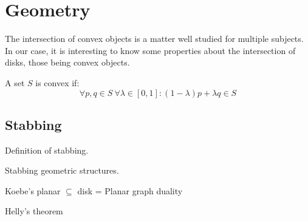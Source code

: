\section{Geometry}
\label{sec:geom}

The intersection of convex objects is a matter well studied for multiple
subjects. In our case, it is interesting to know some properties about
the intersection of disks, those being convex objects.

A set $S$ is convex if:
$$\forall p,q \in S\  \forall \lambda \in [0,1]: (1-\lambda)p + \lambda q \in S$$


\subsection{Stabbing}

Definition of stabbing.

Stabbing geometric structures.\cite{schlipf2013stabbing}

Koebe's planar $\subseteq$ disk
  = Planar graph duality

Helly's theorem
